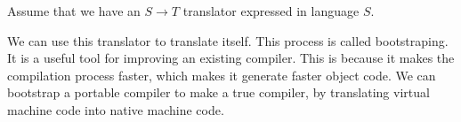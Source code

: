 \documentclass[a4paper, openany]{memoir}
\begin{document}
Assume that we have an $S \to T$ translator expressed in language $S$.
\begin{figure}[H]
    \centering
\end{figure}
\noindent We can use this translator to translate itself. This process is called bootstraping. It is a useful tool for improving an existing compiler. This is because it makes the compilation process faster, which makes it generate faster object code. We can bootstrap a portable compiler to make a true compiler, by translating virtual machine code into native machine code.
\end{document}
